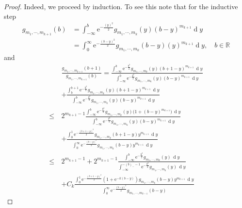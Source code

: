 \documentclass[10pt,a4paper]{amsart}
\newcommand{\R}{\ensuremath{\mathbb{R}}}
\newcommand{\diff}{\ensuremath{\operatorname{d}\!}}
\begin{document}
\begin{proof}
    Indeed, we proceed by induction. To see this note that for the inductive step
    \begin{equation*}
    \begin{array}{cc}
         g_{m_1, \cdots, m_{k+1}}(b) &= \displaystyle\int^b_{-\infty}\mathrm{e}^{-\frac{(y)^2}{2}} g_{m_1, \cdots, m_{k}}(y)(b-y)^{m_{k+1}}\diff y\\
         & = \displaystyle\int^\infty_{0}\mathrm{e}^{-\frac{(b-y)^2}{2}} g_{m_1, \cdots, m_{k}}(b-y)(y)^{m_{k+1}}\diff y,\quad b\in \R
    \end{array}
    \end{equation*}
    and
\begin{align*}
& \frac{g_{m_1, \cdots, m_{k+1}}(b+1)}{g_{m_1, \cdots, m_{k+1}}(b)} =  \frac{
    \displaystyle \int_{-\infty}^b \mathrm{e}^{-\frac{y^2}{2}} g_{m_1, \cdots, m_k}(y)
    (b+1 - y)^{m_{k+1}} \, \diff y
}{
    \displaystyle \int_{-\infty}^b \mathrm{e}^{-\frac{y^2}{2}} g_{m_1, \cdots, m_k}(y)
    (b - y)^{m_{k+1}} \, \diff y
}
\\
& + \frac{
    \displaystyle \int_b^{b+1} \mathrm{e}^{-\frac{y^2}{2}} g_{m_1, \cdots, m_k}(y)
    (b+1 - y)^{m_{k+1}} \, \diff y
}{
    \displaystyle \int_{-\infty}^b \mathrm{e}^{-\frac{y^2}{2}} g_{m_1, \cdots, m_k}(y)
    (b - y)^{m_{k+1}} \, \diff y
} \\
\le\ & 2^{m_{k+1} - 1} \frac{
    \displaystyle \int_{-\infty}^b \mathrm{e}^{-\frac{y^2}{2}} g_{m_1, \cdots, m_k}(y)
    \bigl(1 + (b - y)^{m_{k+1}}\bigr) \, \diff y
}{
    \displaystyle \int_{-\infty}^b \mathrm{e}^{-\frac{y^2}{2}} g_{m_1, \cdots, m_k}(y)
    (b - y)^{m_{k+1}} \, \diff y
} \\
& + \frac{
    \displaystyle \int_0^1 \mathrm{e}^{-\frac{(b+1 - y)^2}{2}} g_{m_1, \cdots, m_k}(b+1 - y)
    y^{m_{k+1}} \, \diff y
}{
    \displaystyle \int_0^\infty \mathrm{e}^{-\frac{(b - y)^2}{2}} g_{m_1, \cdots, m_k}(b - y)
    y^{m_{k+1}} \, \diff y
} \\
\le\ & 2^{m_{k+1} - 1} + 2^{m_{k+1} - 1} 
\frac{
    \displaystyle \int_{-\infty}^b \mathrm{e}^{-\frac{y^2}{2}} g_{m_1, \cdots, m_k}(y) \, \diff y
}{
    \displaystyle \int_{-\infty}^{-(b)_- - 1} \mathrm{e}^{-\frac{y^2}{2}} g_{m_1, \cdots, m_k}(y) \, \diff y
} \\
& + C_k \frac{
    \displaystyle \int_0^1 \mathrm{e}^{-\frac{(b+1 - y)^2}{2}} (1 + \mathrm{e}^{-k(b - y)}) g_{m_1, \cdots, m_k}(b - y)
    y^{m_{k+1}} \, \diff y
}{
    \displaystyle \int_0^\infty \mathrm{e}^{-\frac{(b - y)^2}{2}} g_{m_1, \cdots, m_{k-1}}(b - y)
}
\end{align*}
\end{proof}
\end{document}
